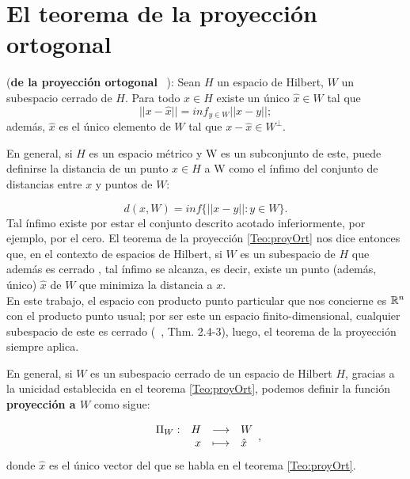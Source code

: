 \section{El teorema de la proyección ortogonal}
\begin{teo} \label{Teo:proyOrt}
(\textbf{de la proyección ortogonal}
~\cite{Nimark}):
Sean $H$ un espacio de Hilbert, $W$ un subespacio cerrado de $H$. 
Para todo $x \in H$ existe un único $\hat{x} \in W $ tal que
\[
||x- \hat{x}|| = inf_{y \in W}|| x-y ||;
\]
además, $\hat{x}$ es el único elemento de $W$
tal que $x-\hat{x} \in W^{\perp} $.
\end{teo}


En general, si $H$ es un espacio métrico y W es un subconjunto
de este, puede definirse la distancia de un punto $x \in H$ a W como
el ínfimo del conjunto de distancias entre $x$ y puntos de $W$:

\[
d(x,W)=inf\{||x-y||: y \in W \}.
\]
\noindent 
Tal ínfimo existe por estar el conjunto descrito acotado inferiormente,
por ejemplo, por el cero. El teorema de la proyección 
\ref{Teo:proyOrt} nos dice entonces que,
en el contexto de espacios de Hilbert, si $W$ es un subespacio de $H$
que además es cerrado , tal ínfimo se alcanza, es decir, existe un punto
(además, único) $\hat{x}$ de $W$ que minimiza la distancia a $x$. \\

En este trabajo, 
el espacio con producto punto
particular que nos concierne 
es $\mathbb{R}^{n}$ con el producto punto usual; por ser
este un espacio finito-dimensional, 
cualquier subespacio de este es cerrado
(~\cite{Kreyszig}, Thm. 2.4-3),
luego, el teorema de la proyección siempre aplica. 

En general, si $W$ es un subespacio cerrado de
un espacio de Hilbert $H$, gracias a la unicidad
establecida en el teorema \ref{Teo:proyOrt},
podemos definir la función \textbf{proyección a $W$}
como sigue:

\begin{equation}
\label{eq3: 1Dic}
\text{${\begin{array}{crcl} \Pi_{W}: & H & \longrightarrow & W \\ \, & x & \longmapsto & \hat{x} \end{array}}$},
\end{equation}
donde $\hat{x}$ es el único vector del que se habla
en el teorema \ref{Teo:proyOrt}.


